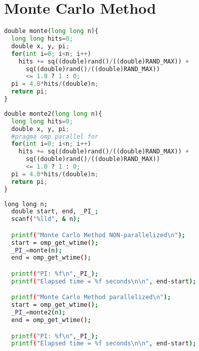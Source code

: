 \documentclass[12pt]{article}
\begin{document}
\section*{Monte Carlo Method}
\begin{lstlisting}[frame=single,language=Python,caption=Non-parallelized Monte Carlo Method (monte.c) \label{code:monte-carlo-nonparallelized}]
double monte(long long n){
  long long hits=0; 
  double x, y, pi;
  for(int i=0; i<n; i++)
    hits += sq((double)rand()/((double)RAND_MAX)) + 
      sq((double)rand()/((double)RAND_MAX)) 
      <= 1.0 ? 1 : 0;
  pi = 4.0*hits/(double)n;
  return pi;
}
\end{lstlisting}
\begin{lstlisting}[frame=single,language=Python,caption=Parallelized Monte Carlo Method (monte.c) \label{code:monte-carlo-parallelized}]
double monte2(long long n){
  long long hits=0; 
  double x, y, pi;
  #pragma omp parallel for
  for(int i=0; i<n; i++)
    hits += sq((double)rand()/((double)RAND_MAX)) + 
      sq((double)rand()/((double)RAND_MAX)) 
      <= 1.0 ? 1 : 0;
  pi = 4.0*hits/(double)n;
  return pi;
}
\end{lstlisting}
\newpage
\begin{lstlisting}[frame=single,language=Bash,caption=Measuring Runtime Performance (monte.c) \label{code:monte-carlo-runtime}]
  long long n;
  double start, end, _PI_;
  scanf("%lld", & n);

  printf("Monte Carlo Method NON-parallelized\n");
  start = omp_get_wtime();
  _PI_=monte(n);
  end = omp_get_wtime();

  printf("PI: %f\n",_PI_);
  printf("Elapsed time = %f seconds\n\n", end-start);

  printf("Monte Carlo Method parallelized\n");
  start = omp_get_wtime();
  _PI_=monte2(n);
  end = omp_get_wtime();

  printf("PI: %f\n",_PI_);
  printf("Elapsed time = %f seconds\n\n", end-start);
\end{lstlisting}
\begin{lstlisting}[frame=single,language=Bash,caption=Output in Terminal (monte.c) \label{code:monte-carlo-terminal-output}]
\end{lstlisting}
\end{document}
